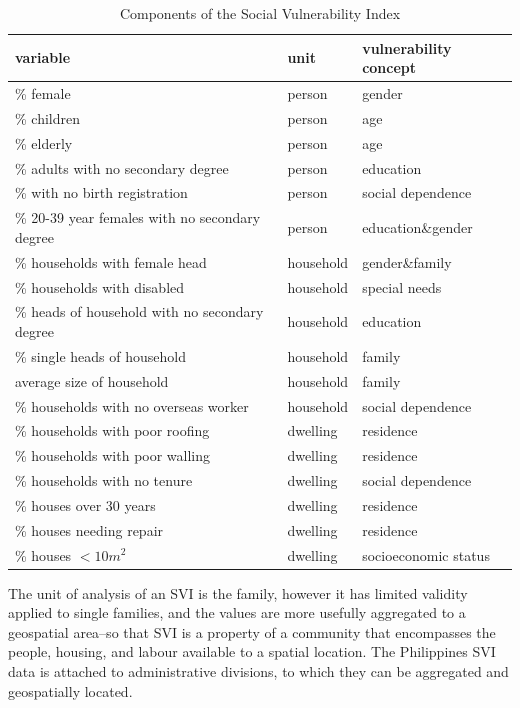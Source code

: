 \documentclass[]{interact}
\theoremstyle{plain}%
\theoremstyle{definition}
\theoremstyle{remark}
\begin{document}
\begin{table}
  \begin{tabular}{l l l}
    \hline
    \bf{variable} & \bf{unit} & \bf{vulnerability concept} \\
    \hline
    \% female & person & gender \\
    \% children & person & age \\
    \% elderly & person & age \\
    \% adults with no secondary degree & person & education \\
    \% with no birth registration & person & social dependence \\
    \% 20-39 year females with no secondary degree & person & education\&gender \\
    \% households with female head & household & gender\&family \\
    \% households with disabled & household & special needs \\
    \% heads of household with no secondary degree & household & education \\
    \% single heads of household & household & family \\
    average size of household & household & family \\
    \% households with no overseas worker & household & social dependence \\
    \% households with poor roofing & dwelling & residence \\
    \% households with poor walling & dwelling & residence \\
    \% households with no tenure & dwelling & social dependence \\
    \% houses over 30 years & dwelling & residence \\
    \% houses needing repair & dwelling & residence \\
    \% houses $< 10m^2$ & dwelling & socioeconomic status \\
    \hline
  \end{tabular}
  \caption{Components of the Social Vulnerability Index} \label{tab:svi}
\end{table}

The unit of analysis of an SVI is the family, however it has limited validity applied to single families, and the values are more usefully aggregated to a geospatial area--so that SVI is a property of a community that encompasses the people, housing, and labour available to a spatial location.  The Philippines SVI data is attached to administrative divisions, to which they can be aggregated and geospatially located.
\end{document}

